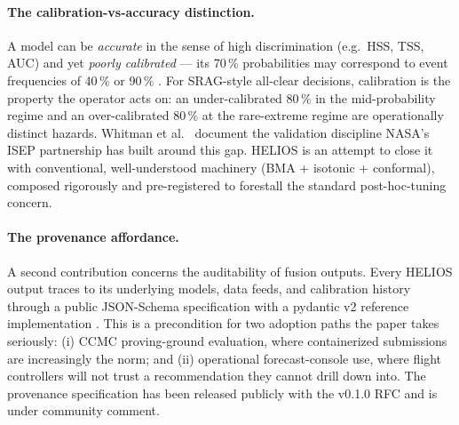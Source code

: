 \documentclass[11pt,letterpaper]{article}
\begin{document}
\paragraph{The calibration-vs-accuracy distinction.}
A model can be \emph{accurate} in the sense of high discrimination
(e.g.\ HSS, TSS, AUC) and yet \emph{poorly calibrated} --- its 70\,\%
probabilities may correspond to event frequencies of 40\,\% or 90\,\%
\cite{niculescu2005}.  For SRAG-style all-clear decisions, calibration is the
property the operator acts on: an under-calibrated 80\,\% in the
mid-probability regime and an over-calibrated 80\,\% at the rare-extreme
regime are operationally distinct hazards.  Whitman et al.\ \cite{whitman2023,whitman2024}
document the validation discipline NASA's ISEP partnership has built around
this gap.  HELIOS is an attempt to close it with conventional, well-understood
machinery (BMA + isotonic + conformal), composed rigorously and pre-registered
to forestall the standard post-hoc-tuning concern.

\paragraph{The provenance affordance.}
A second contribution concerns the auditability of fusion outputs.  Every
HELIOS output traces to its underlying models, data feeds, and calibration
history through a public JSON-Schema specification with a pydantic v2 reference
implementation \cite{helios_provenance_spec}.  This is a precondition for two
adoption paths the paper takes seriously: (i) CCMC proving-ground evaluation,
where containerized submissions are increasingly the norm; and (ii) operational
forecast-console use, where flight controllers will not trust a recommendation
they cannot drill down into.  The provenance specification has been released
publicly with the v0.1.0 RFC \cite{helios_provenance_spec} and is under
community comment.
\end{document}
